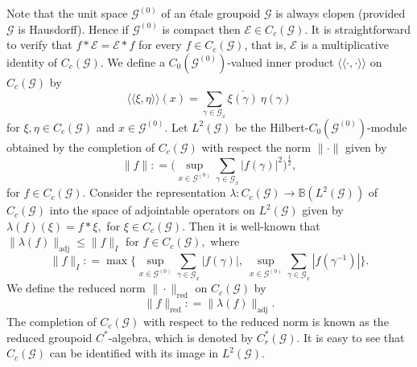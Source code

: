 \documentclass[a4paper,11pt,reqno]{amsart}
\theoremstyle{plain}
\theoremstyle{named}
\numberwithin{equation}{section}
\begin{document}
			Note that the unit space $\mathcal G^{(0)}$ of an étale groupoid $\mathcal G$ is always clopen (provided $\mathcal G$ is Hausdorff). Hence if $\mathcal G^{(0)}$ is compact then $\mathcal E \in C_c (\mathcal G)$. It is straightforward to verify that $f \ast \mathcal E = \mathcal E \ast f$ for every $f \in C_c (\mathcal G)$, that is, $\mathcal E$ is a multiplicative identity of $C_c (\mathcal G).$ We define a $C_0 (\mathcal G^{(0)})$-valued inner product $\langle \langle \cdot, \cdot \rangle \rangle$ on $C_c (\mathcal G)$ by
			$$\langle \langle \xi, \eta \rangle \rangle (x) = \sum\limits_{\gamma \in \mathcal G_x} \overline {\xi (\gamma)}\ {\eta (\gamma)}$$ 
			for $\xi, \eta \in C_c (\mathcal G)$ and $x \in \mathcal G^{(0)}.$ Let $L^2 (\mathcal G)$ be the Hilbert-$C_0 (\mathcal G^{(0)})$-module obtained by the completion of $C_c (\mathcal G)$ with respect the norm $\| \cdot \|$ given by 
			$$\|f\| : = \biggr ( \sup\limits_{x \in \mathcal G^{(0)}}  \sum\limits_{\gamma \in \mathcal G_x} \left \lvert f(\gamma) \right \rvert^2 \biggr )^{\frac {1} {2}},$$
			 for $f \in C_c (\mathcal G).$ Consider the representation $\lambda\colon C_c (\mathcal G) \to \mathbb B (L^2 (\mathcal G))$ of $C_c (\mathcal G)$ into the space of adjointable operators on $L^2 (\mathcal G)$ given by $\lambda (f) (\xi) = f \ast \xi,$ for $\xi \in C_c (\mathcal G).$ Then it is well-known that $\|\lambda (f)\|_{\text {adj}} \leq \|f\|_I$ for $f \in C_c (\mathcal G),$ where 
			 $$\|f\|_I : = \max \biggr \{\sup\limits_{x \in \mathcal G^{(0)}} \sum\limits_{\gamma \in \mathcal G_x} \left \lvert f (\gamma) \right \rvert,\ \sup\limits_{x \in \mathcal G^{(0)}} \sum\limits_{\gamma \in \mathcal G_x} \left \lvert f(\gamma^{-1}) \right \rvert \biggr \}.$$ 
			 We define the reduced norm $\|\cdot \|_{\text {red}}$ on $C_c (\mathcal G)$ by 
			$$\|f\|_{\text {red}} : = \|\lambda (f) \|_{\text {adj}}.$$ 
			The completion of $C_c (\mathcal G)$ with respect to the reduced norm is known as the reduced groupoid $C^{\ast}$-algebra, which is denoted by $C_r^{\ast} (\mathcal G).$ It is easy to see that $C_c (\mathcal G)$ can be identified with its image in $L^2 (\mathcal G).$
			
\end{document}
